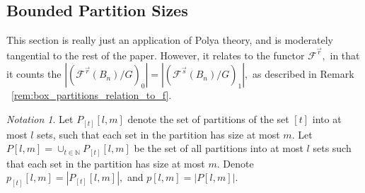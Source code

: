 \documentclass{amsart}
\theoremstyle{remark}
\newtheorem{note}[thm]{Notation}
\newcommand\ssec{\subsection}
\newcommand\BN{{\mathbb N}}
\renewcommand{\vec}[1]{\overrightarrow{#1}}
\begin{document}
\ssec{Bounded Partition Sizes}
This section is really just an application of Polya theory, and is moderately tangential to the rest of the paper. However, it relates to the functor $\mathcal F^{\vec r},$ in that it counts the $|(\mathcal F^{\vec r}(B_n)/G)_0| =  |(\mathcal F^{\vec s}(B_n)/G)_1|,$ as described in Remark ~\ref{rem:box_partitions_relation_to_f}.

\begin{note}
Let $P_{[t]}[l,m]$ denote the set of partitions of the set $[t]$ into at most $l$ sets, such that each set in the partition has size at most $m.$ Let $P[l,m] = \cup_{t \in \BN} P_{[t]}[l,m]$ be the set of all partitions into at most $l$ sets such that each set in the partition has size at most $m.$ Denote $p_{[t]}[l,m] = |P_{[t]}[l,m]|,$ and $p[l,m] = |P[l,m]|.$
\end{note}
\end{document}
